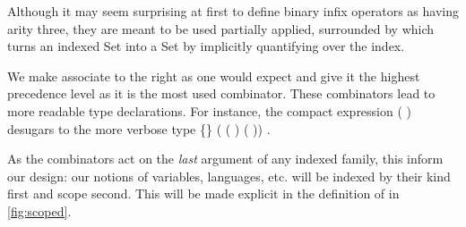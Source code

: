 
Although it may seem surprising at first to define binary infix operators as having
arity three, they are meant to be used partially applied, surrounded by 
which turns an indexed Set into a Set by implicitly quantifying over the index.


We make  associate to the right as one would expect and give it the
highest precedence level as it is the most used combinator. These combinators
lead to more readable type declarations.  For instance, the compact expression
\AF{∀[}   (  )   \AF{]}
desugars to the more verbose type
 \{\}  ( ( )   ( ))   .


As the combinators act on the \emph{last} argument of any indexed family, this inform our
design: our notions of variables, languages, etc. will be indexed by their kind first and
scope second. This will be made explicit in the definition of  in
\cref{fig:scoped}.

